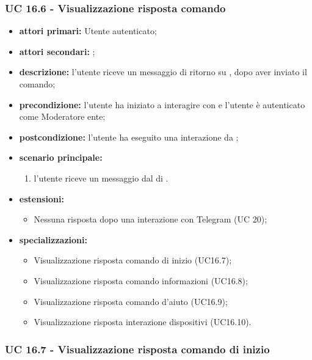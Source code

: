 
	\subsubsection{UC 16.6 - Visualizzazione risposta comando }

	\begin{itemize}
		\item \textbf{attori primari:} Utente autenticato;
		\item \textbf{attori secondari:} ;
		\item \textbf{descrizione:} l'utente riceve un messaggio di ritorno su , dopo aver inviato il comando;
		\item \textbf{precondizione:} l'utente ha iniziato a interagire con  e l'utente è autenticato come Moderatore ente;
		\item \textbf{postcondizione:} l'utente ha eseguito una interazione da ;
		\item \textbf{scenario principale:}
		\begin{enumerate}
			\item l'utente riceve un messaggio dal  di .
		\end{enumerate}
		\item \textbf{estensioni:}
		\begin{itemize}
			\item Nessuna risposta dopo una interazione con Telegram (UC 20);
		\end{itemize}
		\item \textbf{specializzazioni:}
		\begin{itemize}
			\item Visualizzazione risposta comando di inizio (UC16.7);
			\item Visualizzazione risposta comando informazioni (UC16.8);
			\item Visualizzazione risposta comando d'aiuto (UC16.9);
			\item Visualizzazione risposta interazione dispositivi (UC16.10).
		\end{itemize}
	\end{itemize}

	\subsubsection{UC 16.7 - Visualizzazione risposta comando di inizio }

